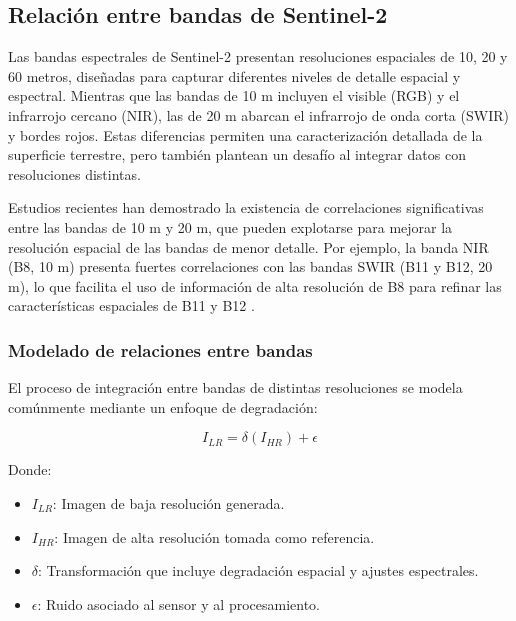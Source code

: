     \subsection{Relación entre bandas de Sentinel-2}

        Las bandas espectrales de Sentinel-2 presentan resoluciones espaciales de 10, 20 y 60 metros, diseñadas para capturar diferentes niveles de detalle espacial y espectral. Mientras que las bandas de 10 m incluyen el visible (RGB) y el infrarrojo cercano (NIR), las de 20 m abarcan el infrarrojo de onda corta (SWIR) y bordes rojos. Estas diferencias permiten una caracterización detallada de la superficie terrestre, pero también plantean un desafío al integrar datos con resoluciones distintas.
                
        Estudios recientes han demostrado la existencia de correlaciones significativas entre las bandas de 10 m y 20 m, que pueden explotarse para mejorar la resolución espacial de las bandas de menor detalle. Por ejemplo, la banda NIR (B8, 10 m) presenta fuertes correlaciones con las bandas SWIR (B11 y B12, 20 m), lo que facilita el uso de información de alta resolución de B8 para refinar las características espaciales de B11 y B12 \autocite{lanaras2018super}.
                        
        \subsubsection{Modelado de relaciones entre bandas}
                
            El proceso de integración entre bandas de distintas resoluciones se modela comúnmente mediante un enfoque de degradación:
            
            \begin{equation}
                I_{LR} = \delta(I_{HR}) + \epsilon
            \end{equation}
            
            Donde:
            \begin{itemize}
                \item \( I_{LR} \): Imagen de baja resolución generada.
                \item \( I_{HR} \): Imagen de alta resolución tomada como referencia.
                \item \( \delta \): Transformación que incluye degradación espacial y ajustes espectrales.
                \item \( \epsilon \): Ruido asociado al sensor y al procesamiento.
            \end{itemize}
            
